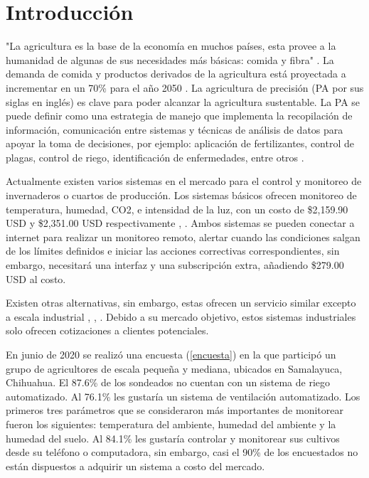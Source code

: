 \section*{Introducción}

"La agricultura es la base de la economía en muchos países, esta provee a la humanidad de algunas de sus necesidades más básicas: comida y fibra" \cite{appsremotesensing}. La demanda de comida y productos derivados de la agricultura está proyectada a incrementar en un 70\% para el año 2050 \cite{wik_pingali_brocai_2008}. La agricultura de precisión (PA por sus siglas en inglés) es clave para poder alcanzar la agricultura sustentable. La PA se puede definir como una estrategia de manejo que implementa la recopilación de información, comunicación entre sistemas y técnicas de análisis de datos para apoyar la toma de decisiones, por ejemplo: aplicación de fertilizantes, control de plagas, control de riego, identificación de enfermedades, entre otros \cite{appsremotesensing}.

Actualmente existen varios sistemas en el mercado para el control y monitoreo de invernaderos o cuartos de producción. Los sistemas básicos ofrecen monitoreo de temperatura, humedad, CO2, e intensidad de la luz, con un costo de \$2,159.90 USD y \$2,351.00 USD respectivamente \cite{intelliclimate_kit_2021}, \cite{smartbee_kit_2021}. Ambos sistemas se pueden conectar a internet para realizar un monitoreo remoto, alertar cuando las condiciones salgan de los límites definidos e iniciar las acciones correctivas correspondientes, sin embargo, \cite{intelliclimate_kit_2021} necesitará una interfaz y una subscripción extra, añadiendo \$279.00 USD al costo. 

Existen otras alternativas, sin embargo, estas ofrecen un servicio similar excepto a escala industrial \cite{ceres_greenhouse_solutions_2021}, \cite{autogrow_climate_control_2021}, \cite{climate_control_2021}. Debido a su mercado objetivo, estos sistemas industriales solo ofrecen cotizaciones a clientes potenciales.

En junio de 2020 se realizó una encuesta (\ref{encuesta}) en la que participó un grupo de agricultores de escala pequeña y mediana, ubicados en Samalayuca, Chihuahua. El 87.6\% de los sondeados no cuentan con un sistema de riego automatizado. Al 76.1\% les gustaría un sistema de ventilación automatizado. Los primeros tres parámetros que se consideraron más importantes de monitorear fueron los siguientes: temperatura del ambiente, humedad del ambiente y la humedad del suelo. Al 84.1\% les gustaría controlar y monitorear sus cultivos desde su teléfono o computadora, sin embargo, casi el 90\% de los encuestados no están dispuestos a adquirir un sistema a costo del mercado.
